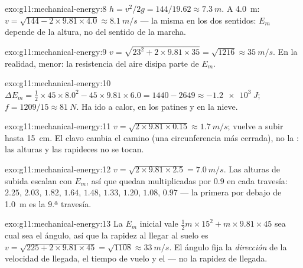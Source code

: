 \begin{solution}{exo:g11:mechanical-energy:8}
$h = v^2/2g = 144/19.62 \approx \qty{7.3}{m}$. A \qty{4.0}{m}:
$v = \sqrt{144 - 2 \times 9.81 \times 4.0} \approx \qty{8.1}{m/s}$ ---
la misma en los dos sentidos: $E_m$ depende de la altura, no del sentido
de la marcha.
\end{solution}

\begin{solution}{exo:g11:mechanical-energy:9}
$v = \sqrt{23^2 + 2 \times 9.81 \times 35} = \sqrt{1216} \approx
\qty{35}{m/s}$. En la realidad, menor: la resistencia del aire disipa
parte de $E_m$.
\end{solution}

\begin{solution}{exo:g11:mechanical-energy:10}
$\Delta E_m = \tfrac12 \times 45 \times 8.0^2 - 45 \times 9.81 \times
6.0 = 1440 - 2649 \approx \qty{-1.2e3}{J}$;
$f = 1209/15 \approx \qty{81}{N}$. Ha ido a calor, en los patines y en
la nieve.
\end{solution}

\begin{solution}{exo:g11:mechanical-energy:11}
$v = \sqrt{2 \times 9.81 \times 0.15} \approx \qty{1.7}{m/s}$; vuelve a
subir hasta \qty{15}{cm}. El clavo cambia el camino (una circunferencia
más cerrada), no la : las alturas y las rapideces no se tocan.
\end{solution}

\begin{solution}{exo:g11:mechanical-energy:12}
$v = \sqrt{2 \times 9.81 \times 2.5} = \qty{7.0}{m/s}$. Las alturas de
subida escalan con $E_m$, así que quedan multiplicadas por $0.9$ en cada
travesía: $2.25$, $2.03$, $1.82$, $1.64$, $1.48$, $1.33$, $1.20$,
$1.08$, $0.97$ --- la primera por debajo de \qty{1.0}{m} es la $9$.ª
travesía.
\end{solution}

\begin{solution}{exo:g11:mechanical-energy:13}
La $E_m$ inicial vale
$\tfrac12 m \times 15^2 + m \times 9.81 \times 45$ sea cual sea el
ángulo, así que la rapidez al llegar al suelo es
$v = \sqrt{225 + 2 \times 9.81 \times 45} = \sqrt{1108} \approx
\qty{33}{m/s}$. El ángulo fija la \emph{dirección} de la velocidad de
llegada, el tiempo de vuelo y el  --- no la rapidez de llegada.
\end{solution}

